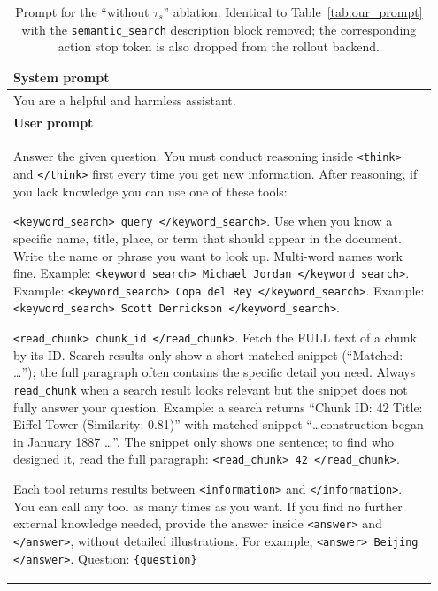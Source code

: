 \documentclass[11pt]{article}
\begin{document}
\begin{table}[t]
\centering
\small
\begin{tabular}{p{0.95\linewidth}}
\hline
\textbf{System prompt} \\
\hline
You are a helpful and harmless assistant. \\
\hline
\textbf{User prompt} \\
\hline
Answer the given question. You must conduct reasoning inside \texttt{\textless{}think\textgreater{}} and \texttt{\textless{}/think\textgreater{}} first every time you get new information. After reasoning, if you lack knowledge you can use one of these tools:

\quad \texttt{\textless{}keyword\_search\textgreater{} query \textless{}/keyword\_search\textgreater{}}.
Use when you know a specific name, title, place, or term that should appear in the document. Write the name or phrase you want to look up. Multi-word names work fine.
Example: \texttt{\textless{}keyword\_search\textgreater{} Michael Jordan \textless{}/keyword\_search\textgreater{}}.
Example: \texttt{\textless{}keyword\_search\textgreater{} Copa del Rey \textless{}/keyword\_search\textgreater{}}.
Example: \texttt{\textless{}keyword\_search\textgreater{} Scott Derrickson \textless{}/keyword\_search\textgreater{}}.

\quad \texttt{\textless{}read\_chunk\textgreater{} chunk\_id \textless{}/read\_chunk\textgreater{}}.
Fetch the FULL text of a chunk by its ID. Search results only show a short matched snippet (``Matched: \ldots''); the full paragraph often contains the specific detail you need. Always \texttt{read\_chunk} when a search result looks relevant but the snippet does not fully answer your question.
Example: a search returns ``Chunk ID: 42 \textbar{} Title: Eiffel Tower (Similarity: 0.81)'' with matched snippet ``\ldots construction began in January 1887 \ldots''. The snippet only shows one sentence; to find who designed it, read the full paragraph: \texttt{\textless{}read\_chunk\textgreater{} 42 \textless{}/read\_chunk\textgreater{}}.

Each tool returns results between \texttt{\textless{}information\textgreater{}} and \texttt{\textless{}/information\textgreater{}}. You can call any tool as many times as you want. If you find no further external knowledge needed, provide the answer inside \texttt{\textless{}answer\textgreater{}} and \texttt{\textless{}/answer\textgreater{}}, without detailed illustrations. For example, \texttt{\textless{}answer\textgreater{} Beijing \textless{}/answer\textgreater{}}. Question: \texttt{\{question\}} \\
\hline
\end{tabular}
\caption{Prompt for the ``without $\tau_s$'' ablation. Identical to Table~\ref{tab:our_prompt} with the \texttt{semantic\_search} description block removed; the corresponding action stop token is also dropped from the rollout backend.}
\label{tab:prompt_no_semantic}
\end{table}
\end{document}
